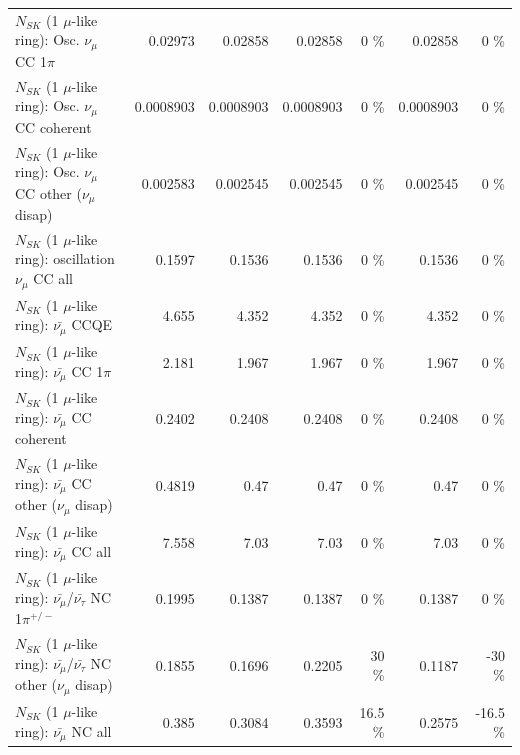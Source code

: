 \begin{table}
\begin{tabular}{| l | r | r | r  r | r  r |}
                          $N_{SK}$ (1 $\mu$-like ring): Osc. $\nu_\mu$ CC 1$\pi$ &         0.02973 &         0.02858 &         0.02858 &        0 \%  &         0.02858 &        0 \%  \\ 
                        $N_{SK}$ (1 $\mu$-like ring): Osc. $\nu_\mu$ CC coherent &       0.0008903 &       0.0008903 &       0.0008903 &        0 \%  &       0.0008903 &        0 \%  \\ 
         $N_{SK}$ (1 $\mu$-like ring): Osc. $\nu_\mu$ CC other ($\nu_\mu$ disap) &        0.002583 &        0.002545 &        0.002545 &        0 \%  &        0.002545 &        0 \%  \\ 
                      $N_{SK}$ (1 $\mu$-like ring): oscillation $\nu_\mu$ CC all &          0.1597 &          0.1536 &          0.1536 &        0 \%  &          0.1536 &        0 \%  \\ 
\hline
\hline
                              $N_{SK}$ (1 $\mu$-like ring): $\bar{\nu_\mu}$ CCQE &           4.655 &           4.352 &           4.352 &        0 \%  &           4.352 &        0 \%  \\ 
                         $N_{SK}$ (1 $\mu$-like ring): $\bar{\nu_\mu}$ CC 1$\pi$ &           2.181 &           1.967 &           1.967 &        0 \%  &           1.967 &        0 \%  \\ 
                       $N_{SK}$ (1 $\mu$-like ring): $\bar{\nu_\mu}$ CC coherent &          0.2402 &          0.2408 &          0.2408 &        0 \%  &          0.2408 &        0 \%  \\ 
        $N_{SK}$ (1 $\mu$-like ring): $\bar{\nu_\mu}$ CC other ($\nu_\mu$ disap) &          0.4819 &            0.47 &            0.47 &        0 \%  &            0.47 &        0 \%  \\ 
                          $N_{SK}$ (1 $\mu$-like ring): $\bar{\nu_{\mu}}$ CC all &           7.558 &            7.03 &            7.03 &        0 \%  &            7.03 &        0 \%  \\ 
\hline
  $N_{SK}$ (1 $\mu$-like ring): $\bar{\nu_\mu}$/$\bar{\nu_\tau}$ NC 1$\pi^{+/-}$ &          0.1995 &          0.1387 &          0.1387 &        0 \%  &          0.1387 &        0 \%  \\ 
$N_{SK}$ (1 $\mu$-like ring): $\bar{\nu_\mu}$/$\bar{\nu_\tau}$ NC other ($\nu_\mu$ disap) &          0.1855 &          0.1696 &          0.2205 &       30 \%  &          0.1187 &      -30 \%  \\ 
                          $N_{SK}$ (1 $\mu$-like ring): $\bar{\nu_{\mu}}$ NC all &           0.385 &          0.3084 &          0.3593 &     16.5 \%  &          0.2575 &    -16.5 \%  \\ 

\end{tabular}
\end{table}
